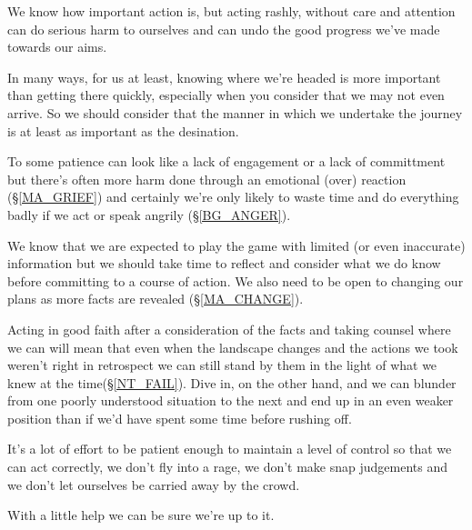 \cleardoublepage
\begin{multicols}{2}

We know how important action is, but acting rashly, without care and attention can do serious harm to ourselves and can undo the good progress we've made towards our aims.

In many ways, for us at least, knowing where we're headed is more important than getting there quickly, especially when you consider that we may not even arrive. So we should consider that the manner in which we undertake the journey is at least as important as the desination.

To some patience can look like a lack of engagement or a lack of committment but there's often more harm done through an emotional (over) reaction (\S \ref{MA_GRIEF}) and certainly we're only likely to waste time and do everything badly if we act or speak angrily (\S \ref{BG_ANGER}).

We know that we are expected to play the game with limited (or even inaccurate) information but we should take time to reflect and consider what we do know before committing to a course of action. We also need to be open to changing our plans as more facts are revealed (\S \ref{MA_CHANGE}).  

Acting in good faith after a consideration of the facts and taking counsel where we can will mean that even when the landscape changes and the actions we took weren't right in retrospect we can still stand by them in the light of what we knew at the time(\S \ref{NT_FAIL}). Dive in, on the other hand, and we can blunder from one poorly understood situation to the next and end up in an even weaker position than if we'd have spent some time before rushing off. 

It's a lot of effort to be patient enough to maintain a level of control so that we can act correctly, we don't fly into a rage, we don't make snap judgements and we don't let ourselves be carried away by the crowd.

With a little help we can be sure we're up to it.

\end{multicols}

